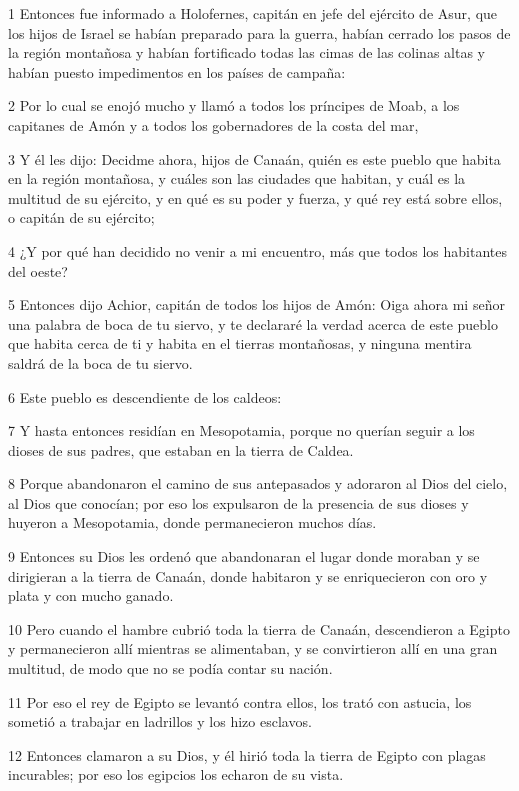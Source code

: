 \par 1 Entonces fue informado a Holofernes, capitán en jefe del ejército de Asur, que los hijos de Israel se habían preparado para la guerra, habían cerrado los pasos de la región montañosa y habían fortificado todas las cimas de las colinas altas y habían puesto impedimentos en los países de campaña:
\par 2 Por lo cual se enojó mucho y llamó a todos los príncipes de Moab, a los capitanes de Amón y a todos los gobernadores de la costa del mar,
\par 3 Y él les dijo: Decidme ahora, hijos de Canaán, quién es este pueblo que habita en la región montañosa, y cuáles son las ciudades que habitan, y cuál es la multitud de su ejército, y en qué es su poder y fuerza, y qué rey está sobre ellos, o capitán de su ejército;
\par 4 ¿Y por qué han decidido no venir a mi encuentro, más que todos los habitantes del oeste?
\par 5 Entonces dijo Achior, capitán de todos los hijos de Amón: Oiga ahora mi señor una palabra de boca de tu siervo, y te declararé la verdad acerca de este pueblo que habita cerca de ti y habita en el tierras montañosas, y ninguna mentira saldrá de la boca de tu siervo.
\par 6 Este pueblo es descendiente de los caldeos:
\par 7 Y hasta entonces residían en Mesopotamia, porque no querían seguir a los dioses de sus padres, que estaban en la tierra de Caldea.
\par 8 Porque abandonaron el camino de sus antepasados ​​y adoraron al Dios del cielo, al Dios que conocían; por eso los expulsaron de la presencia de sus dioses y huyeron a Mesopotamia, donde permanecieron muchos días.
\par 9 Entonces su Dios les ordenó que abandonaran el lugar donde moraban y se dirigieran a la tierra de Canaán, donde habitaron y se enriquecieron con oro y plata y con mucho ganado.
\par 10 Pero cuando el hambre cubrió toda la tierra de Canaán, descendieron a Egipto y permanecieron allí mientras se alimentaban, y se convirtieron allí en una gran multitud, de modo que no se podía contar su nación.
\par 11 Por eso el rey de Egipto se levantó contra ellos, los trató con astucia, los sometió a trabajar en ladrillos y los hizo esclavos.
\par 12 Entonces clamaron a su Dios, y él hirió toda la tierra de Egipto con plagas incurables; por eso los egipcios los echaron de su vista.
